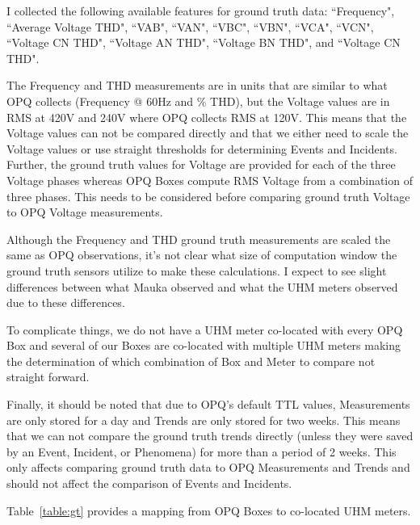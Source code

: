 I collected the following available features for ground truth data: ``Frequency", ``Average Voltage THD", ``VAB", ``VAN", ``VBC", ``VBN", ``VCA", ``VCN", ``Voltage CN THD", ``Voltage AN THD", ``Voltage BN THD", and ``Voltage CN THD".

The Frequency and THD measurements are in units that are similar to what OPQ collects (Frequency @ 60Hz and \% THD), but the Voltage values are in RMS at 420V and 240V where OPQ collects RMS at 120V. This means that the Voltage values can not be compared directly and that we either need to scale the Voltage values or use straight thresholds for determining Events and Incidents. Further, the ground truth values for Voltage are provided for each of the three Voltage phases whereas OPQ Boxes compute RMS Voltage from a combination of three phases. This needs to be considered before comparing ground truth Voltage to OPQ Voltage measurements.

Although the Frequency and THD ground truth measurements are scaled the same as OPQ observations, it's not clear what size of computation window the ground truth sensors utilize to make these calculations. I expect to see slight differences between what Mauka observed and what the UHM meters observed due to these differences.

To complicate things, we do not have a UHM meter co-located with every OPQ Box and several of our Boxes are co-located with multiple UHM meters making the determination of which combination of Box and Meter to compare not straight forward.

Finally, it should be noted that due to OPQ's default TTL values, Measurements are only stored for a day and Trends are only stored for two weeks. This means that we can not compare the ground truth trends directly (unless they were saved by an Event, Incident, or Phenomena) for more than a period of 2 weeks. This only affects comparing ground truth data to OPQ Measurements and Trends and should not affect the comparison of Events and Incidents.

Table~\ref{table:gt} provides a mapping from OPQ Boxes to co-located UHM meters.


